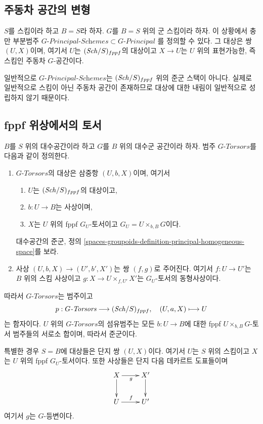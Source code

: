 \subsection{주동차 공간의 변형}
\label{subsection-variant-principal-homogeneous-spaces}

\noindent
$S$를 스킴이라 하고 $B = S$라 하자. $G$를 $B = S$ 위의 군 스킴이라 하자.
이 상황에서 충만 부분범주
$G\textit{-Principal-Schemes} \subset G\textit{-Principal}$
를 정의할 수 있다. 그 대상은 쌍 $(U, X)$이며, 여기서 $U$는
$(\mathit{Sch}/S)_{fppf}$의 대상이고 $X \to U$는 $U$ 위의 표현가능한, 즉 스킴인
주동차 $G$-공간이다.

\medskip\noindent
일반적으로 $G\textit{-Principal-Schemes}$는 $(\mathit{Sch}/S)_{fppf}$ 위의 준군
스택이 아니다. 실제로 일반적으로 스킴이 아닌 주동차 공간이 존재하므로
대상에 대한 내림이 일반적으로 성립하지 않기 때문이다.



\subsection{fppf 위상에서의 토서}
\label{subsection-fppf-torsors}

\noindent
$B$를 $S$ 위의 대수공간이라 하고 $G$를 $B$ 위의 대수군 공간이라 하자.
범주 $G\textit{-Torsors}$를 다음과 같이 정의한다.
\begin{enumerate}
\item $G\textit{-Torsors}$의 대상은 삼중항 $(U, b, X)$이며, 여기서
\begin{enumerate}
\item $U$는 $(\mathit{Sch}/S)_{fppf}$의 대상이고,
\item $b : U \to B$는 사상이며,
\item $X$는 $U$ 위의 fppf $G_U$-토서이고 $G_U = U \times_{b, B} G$이다.
\end{enumerate}
대수공간의 준군, 정의
\ref{spaces-groupoids-definition-principal-homogeneous-space}를 보라.
\item 사상 $(U, b, X) \to (U', b', X')$는 쌍 $(f, g)$로 주어진다.
여기서 $f : U \to U'$는 $B$ 위의 스킴 사상이고
$g : X \to U \times_{f, U'} X'$는 $G_U$-토서의 동형사상이다.
\end{enumerate}
따라서 $G\textit{-Torsors}$는 범주이고
$$
p : G\textit{-Torsors} \longrightarrow (\mathit{Sch}/S)_{fppf},
\quad
(U, a, X) \longmapsto U
$$
는 함자이다. $U$ 위의 $G\textit{-Torsors}$의 섬유범주는 모든
$b : U \to B$에 대한 fppf $U \times_{b, B} G$-토서 범주들의 서로소
합이며, 따라서 준군이다.

\medskip\noindent
특별한 경우 $S = B$에 대상들은 단지 쌍 $(U, X)$이다. 여기서 $U$는
$S$ 위의 스킴이고 $X$는 $U$ 위의 fppf $G_U$-토서이다. 또한 사상들은
단지 다음 데카르트 도표들이며
$$
\xymatrix{
X \ar[d] \ar[r]_g & X' \ar[d] \\
U \ar[r]^f & U'
}
$$
여기서 $g$는 $G$-등변이다.

